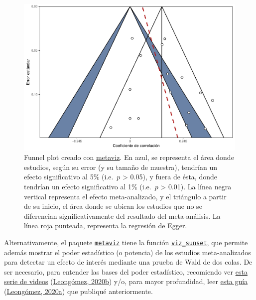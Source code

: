 \documentclass[
  bookmarksnumbered]{article}
\begin{document}
\begin{figure}
\centering
\includegraphics{Meta-analysis_files/figure-latex/funnel-plot2-1.pdf}
\caption{\label{fig:funnel-plot2}Funnel plot creado con \href{https://cran.r-project.org/web/packages/metaviz/vignettes/metaviz.html}{metaviz}. En azul, se representa el área donde estudios, según su error (y su tamaño de muestra), tendrían un efecto significativo al 5\% (i.e.~\(p\) \textgreater{} 0.05), y fuera de ésta, donde tendrían un efecto significativo al 1\% (i.e.~\(p\) \textgreater{} 0.01). La línea negra vertical representa el efecto meta-analizado, y el triángulo a partir de su inicio, el área donde se ubican los estudios que no se diferencian significativamente del resultado del meta-análisis. La línea roja punteada, representa la regresión de Egger.}
\end{figure}

Alternativamente, el paquete \href{https://cran.r-project.org/web/packages/metaviz/vignettes/metaviz.html}{\texttt{metaviz}} tiene la función \href{https://cran.r-project.org/web/packages/metaviz/vignettes/metaviz.html\#sunset-power-enhanced-funnel-plots}{\texttt{viz\_sunset}}, que permite además mostrar el poder estadístico (o potencia) de los estudios meta-analizados para detectar un efecto de interés mediante una prueba de Wald de dos colas. De ser necesario, para entender las bases del poder estadístico, recomiendo ver \href{https://youtube.com/playlist?list\%20=\%20PLHk7UNt35ccVdyHqnQ6oXVYA6JBNFrE1x}{esta serie de videos} (\protect\hyperlink{ref-leongomezPoderRvid2020}{Leongómez, 2020b}) y/o, para mayor profundidad, leer \href{https://doi.org/10.5281/zenodo.3988776}{esta guía} (\protect\hyperlink{ref-leongomezAnalisisPoderEstadistico2020}{Leongómez, 2020a}) que publiqué anteriormente.
\end{document}

